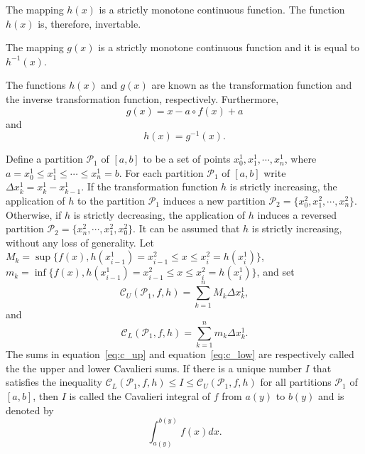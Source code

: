 \documentclass[twoside,reqno,11pt]{fcaa-var} %
\begin{document}
\begin{theorem}
The mapping $h(x)$ is a strictly monotone continuous function. The function $h(x)$ is, therefore, invertable.
\end{theorem}

\begin{theorem}
\label{t:inv}
The mapping $g(x)$ is a strictly monotone continuous function and it is equal to $h^{-1}(x)$.
\end{theorem}

\noindent
The functions $h(x)$ and $g(x)$ are known as the transformation function and the inverse transformation function, respectively. Furthermore,
\begin{equation}
\label{eq:g_def}
g(x) = x - a\circ f(x) + a 
\end{equation}
and
\begin{equation}
\label{eq:h_def}
h(x) = g^{-1}(x). 
\end{equation}

\begin{definition}\label{def:cav_integral}
Define a partition $\mathcal{P}_1$ of $[a,b]$ to be a set of points $x_0^1, x_1^1,\cdots,x_n^1$, 
where $a = x_0^1 \leq x_1^1 \leq \cdots \leq x_n^1 = b$. For each partition 
$\mathcal{P}_1$ of $[a,b]$ write $\Delta x_k^1 = x_k^1-x_{k-1}^1$. 
If the transformation function $h$ is strictly increasing,
the application of $h$ to the partition $\mathcal{P}_1$ induces a new partition $\mathcal{P}_2 = \{x_0^2, x_1^2,\cdots, x_n^2\}$.
Otherwise, if $h$ is strictly decreasing, the application of $h$ induces a reversed partition $\mathcal{P}_2 = \{x_n^2, \cdots, x_1^2,x_0^2\}$. It
can be assumed that $h$ is strictly increasing, without any loss of generality.  Let 
$M_k = \sup \{f (x), h(x_{i-1}^1) = x_{i-1}^2 \leq x \leq x_i^2 = h(x_i^1)\}$, $m_k = \inf \{f (x), h(x_{i-1}^1) = x_{i-1}^2 \leq x \leq x_i^2 = h(x_i^1)\}$, and set 
\begin{equation}
\label{eq:c_up}
\mathcal{C}_U(\mathcal{P}_1,f,h) = \sum_{k=1}^n M_k \Delta x_k^1, 
\end{equation}
and
\begin{equation}
\label{eq:c_low}
\mathcal{C}_L(\mathcal{P}_1,f,h) = \sum_{k=1}^n m_k \Delta x_k^1. 
\end{equation}
The sums in equation~\eqref{eq:c_up} and equation~\eqref{eq:c_low} are respectively called the the upper and lower Cavalieri sums.
If there is a unique number $I$ that satisfies the inequality $\mathcal{C}_L(\mathcal{P}_1,f,h)\leq I \leq \mathcal{C}_U(\mathcal{P}_1,f,h)$ for all 
partitions $\mathcal{P}_1$ of $[a,b]$, then $I$ is called the Cavalieri integral of $f$ from $a(y)$ to $b(y)$ and is denoted by
\begin{equation}
\int_{a(y)}^{b(y)} f(x) dx.
\end{equation}
\end{definition}
\end{document}
